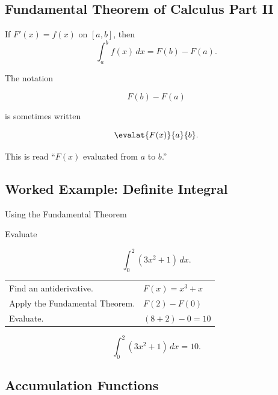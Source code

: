 \subsection{Fundamental Theorem of Calculus Part II}
\label{subsec:ftc-part-two}

\begin{theorem}
If \(F'(x)=f(x)\) on \([a,b]\), then
\[ \int_a^b f(x)\,dx=F(b)-F(a). \]
\end{theorem}

The notation

\[ F(b)-F(a) \]

is sometimes written

\[ \evalat{F(x)}{a}{b}. \]

This is read ``\(F(x)\) evaluated from \(a\) to \(b\).''

\subsection{Worked Example: Definite Integral}
\label{subsec:worked-definite-integral}

\begin{workedexamplebox}{Using the Fundamental Theorem}

Evaluate

\[ \int_0^2(3x^2+1)\,dx. \]

\begin{tabularx}{\textwidth}{@{}>{\raggedright\arraybackslash}p{}X@{}}
Find an antiderivative. &
\(F(x)=x^3+x\)\\
Apply the Fundamental Theorem. &
\(\displaystyle F(2)-F(0)\)\\
Evaluate. &
\((8+2)-0=10\)
\end{tabularx}

\begin{answerbox}
\[ \boxed{\int_0^2(3x^2+1)\,dx=10.} \]
\end{answerbox}
\end{workedexamplebox}

\subsection{Accumulation Functions}
\label{subsec:accumulation-functions}

